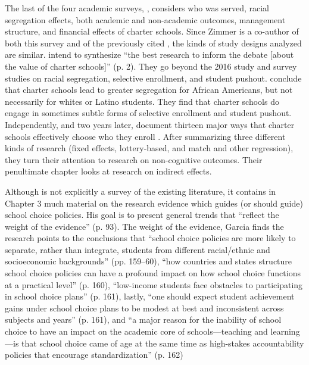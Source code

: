 The last of the four academic surveys, \textcite{Zimmer.etal2019}, considers who was served, racial segregation effects, both academic and non-academic outcomes, management structure, and financial effects of charter schools. Since Zimmer is a co-author of both this survey and of the previously cited \textcite{Epple.etal2016}, the kinds of study designs analyzed are similar. \citeauthor{Zimmer.etal2019} intend to synthesize ``the best research to inform the debate [about the value of charter schools]'' (p. 2). They go beyond the 2016 study and survey studies on racial segregation, selective enrollment, and student pushout. \citeauthor{Zimmer.etal2019} conclude that charter schools lead to greater segregation for African Americans, but not necessarily for whites or Latino students. They find that charter schools do engage in sometimes subtle forms of selective enrollment and student pushout. Independently, and two years later, \citeauthor{Mommandi.Welner2021} document thirteen major ways that charter schools effectively choose who they enroll \parencite{Mommandi.Welner2021}. After summarizing three different kinds of research (fixed effects, lottery-based, and match and other regression), they turn their attention to research on non-cognitive outcomes. Their penultimate chapter looks at research on indirect effects.  

Although \textcite{Garcia2018} is not explicitly a survey of the existing literature, it contains in Chapter 3 
much material on the research evidence which guides (or should guide) school choice policies. His goal is to present general trends that ``reflect the weight of the evidence'' (p. 93). The weight of the evidence, Garcia finds the research points to the conclusions that ``school choice policies are more likely to separate, rather than integrate, students from different racial/ethnic and socioeconomic backgrounds'' (pp. 159–60), ``how countries and states structure school choice policies can have a profound impact on how school choice functions at a practical level'' (p. 160), ``low-income students face obstacles to participating in school choice plans'' (p. 161), lastly, ``one should expect student achievement gains under school choice plans to be modest at best and inconsistent across subjects and years'' (p. 161), and ``a major reason for the inability of school
choice to have an impact on the academic core of schools—teaching and learning—is that school choice came of age
at the same time as high-stakes accountability policies that encourage standardization'' (p. 162)

